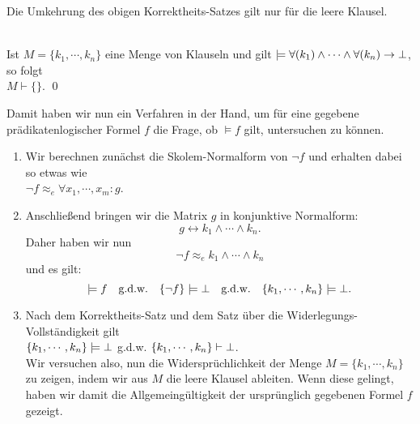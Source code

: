 \noindent
Die Umkehrung des obigen Korrektheits-Satzes gilt nur für die leere Klausel.
\begin{Satz} \hspace*{\fill} \\
  Ist $M = \{k_1,\cdots,k_n\}$ eine Menge von Klauseln und gilt 
  $\models \forall(k_1) \wedge \cdots \wedge \forall(k_n) \rightarrow \bot$, so folgt \\[0.2cm]
  \hspace*{1.3cm} $M \vdash \{\}$.
    \qed
\end{Satz}
\noindent
Damit haben wir nun ein Verfahren in der Hand, um für eine gegebene 
prädikatenlogischer Formel $f$ die Frage, ob $\models f$ gilt, untersuchen zu können.
\begin{enumerate}
\item Wir berechnen zunächst die Skolem-Normalform von $\neg f$ und erhalten dabei so etwas wie \\[0.2cm]
      \hspace*{1.3cm} $\neg f \approx_e \forall x_1, \cdots, x_m \colon g$.
\item Anschließend bringen wir die Matrix $g$ in konjunktive Normalform: 
      \[ g \leftrightarrow k_1 \wedge \cdots \wedge k_n. \]
      Daher haben wir nun 
      \[ \neg f \approx_e k_1 \wedge \cdots \wedge k_n \] 
      und es gilt: 
      \[  
          \models f                           \quad \mbox{g.d.w.} \quad
          \{\neg f\} \models \bot          \quad \mbox{g.d.w.} \quad 
          \{k_1,\cdots,k_n\} \models \bot.
      \]
\item Nach dem Korrektheits-Satz und dem Satz über die Widerlegungs-Vollständigkeit gilt
      \\[0.2cm]
      \hspace*{1.3cm} 
      $\{k_1,\cdots,k_n\} \models \bot$ \quad g.d.w. \quad 
      $\{k_1,\cdots,k_n\} \vdash \bot$. \\[0.2cm]
      Wir versuchen also, nun die Widersprüchlichkeit der Menge $M = \{ k_1, \cdots, k_n \}$  zu zeigen, indem wir
      aus $M$ die leere Klausel ableiten.
      Wenn diese gelingt, haben wir damit die Allgemeingültigkeit der ursprünglich
      gegebenen Formel $f$ gezeigt.
\end{enumerate}

